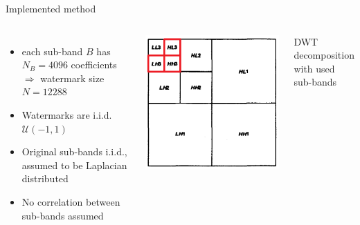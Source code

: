 \begin{frame}{\insertsection}{Implemented method}
	\begin{columns}[T]
	\begin{itemize}
	\item each sub-band $B$ has $N_B = 4096$ coefficients 
	\newline \textcolor{TUDblue}{$\Rightarrow$} watermark size $N = 12288$
	\item Watermarks are i.i.d. $\mathcal{U}(-1, 1)$
	\item Original sub-bands i.i.d., assumed to be Laplacian distributed
	\item No correlation between sub-bands assumed
	\end{itemize}
	\centering
	\includegraphics[width=.8\textwidth]{Bilder/threelayerMotivationPainted} 
	
	DWT decomposition with used sub-bands 
	\end{columns} 	
\end{frame}